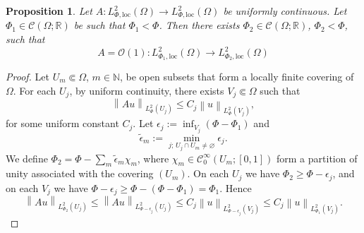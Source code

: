\documentclass{article}
\newtheorem{prop}[theo]{Proposition}
\newcommand{\loc}{\mathrm{loc}}
\newcommand{\norm}[1]{\left\|#1\right\|}
\newcommand{\Cinf}{\mathscr{C}^\infty}
\newcommand{\RM}{\mathbb{R}}
\newcommand{\NM}{\mathbb{N}}
\begin{document}
\begin{prop}
  \label{prop:phi1}
  Let $A:L_{ \Phi,\loc}^{2}(\Omega) \to L_{ \Phi,\loc}^{2}(\Omega)$ be
  uniformly continuous.  Let $\Phi_1\in \mathscr{C}(\Omega;\RM)$ be
  such that $\Phi_1<\Phi$. Then there exists
  $\Phi_2\in \mathscr{C}(\Omega;\RM)$, $\Phi_2<\Phi$, such that
  \[
  A = \mathcal{O}(1) : L_{ \Phi_1,\loc}^{2}(\Omega) \to L_{
    \Phi_2,\loc}^{2}(\Omega)
  \]
\end{prop}
\begin{proof}
  Let $U_m\Subset \Omega$, $m\in\NM$, be open subsets that form a
  locally finite covering of $\Omega$. For each $U_j$, by uniform
  continuity, there exists $V_j\Subset \Omega$ such that
  \begin{equation}
    \label{eq:3}
    \norm{A u}_{L^2_{\Phi}(U_j)} \leq C_j \norm{u}_{L^2_{\Phi}(V_j)},
  \end{equation}
  for some uniform constant $C_j$.  Let
  $\epsilon_j:= \inf_{V_j} (\Phi-\Phi_1)$ and
  \begin{equation}
    \label{equ:epsilon}
    \tilde\epsilon_m:=\min_{j; \,U_j\cap U_m \neq \varnothing} \epsilon_j.    
  \end{equation}
  We define $\Phi_2=\Phi-\sum_m \tilde\epsilon_m \chi_m$, where
  $\chi_m\in\Cinf_0(U_m; [0,1])$ form a partition of unity associated
  with the covering $(U_m)$. On each $U_j$ we have
  $\Phi_2\geq \Phi- \epsilon_j$, and on each $V_j$ we have
  $\Phi- \epsilon_j \geq \Phi - (\Phi-\Phi_1) = \Phi_1$.  Hence
  \begin{equation}
    \label{eq:3}
    \norm{A u}_{L^2_{\Phi_2}(U_j)} \leq \norm{A u}_{L^2_{\Phi-\epsilon_j}(U_j)}  
    \leq  C_j
    \norm{u}_{L^2_{\Phi-\epsilon_j}(V_j)} \leq  
    C_j \norm{u}_{L^2_{\Phi_1}(V_j)} .
  \end{equation}

\end{proof}
\end{document}
